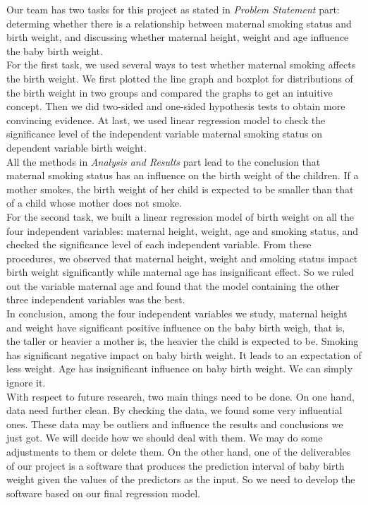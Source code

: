 \documentclass[oneside,12pt]{report}
\begin{document}
Our team has two tasks for this project as stated in \emph{Problem Statement} part: determing whether there is a relationship between maternal smoking status and birth weight, and discussing whether maternal height, weight and age influence the baby birth weight.\\
\indent For the first task, we used several ways to test whether maternal smoking affects the birth weight. We first plotted the line graph and boxplot for distributions of the birth weight in two groups and compared the graphs to get an intuitive concept. Then we did two-sided and one-sided hypothesis tests to obtain more convincing evidence. At last, we used linear regression model to check the significance level of the independent variable maternal smoking status on dependent variable birth weight.\\
\indent All the methods in \emph{Analysis and Results} part lead to the conclusion that maternal smoking status has an influence on the birth weight of the children. If a mother smokes, the birth weight of her child is expected to be smaller than that of a child whose mother does not smoke.\\
\indent For the second task, we built a linear regression model of birth weight on all the four independent variables: maternal height, weight, age and smoking status, and checked the significance level of each independent variable. From these procedures, we observed that maternal height, weight and smoking status impact birth weight significantly while maternal age has insignificant effect. So we ruled out the variable maternal age and found that the model containing the other three independent variables was the best.\\
\indent In conclusion, among the four independent variables we study, maternal height and weight have significant positive influence on the baby birth weigh, that is, the taller or heavier a mother is, the heavier the child is expected to be. Smoking has significant negative impact on baby birth weight. It leads to an expectation of less weight. Age has insignificant influence on baby birth weight. We can simply ignore it.\\
\indent With respect to future research, two main things need to be done. On one hand, data need further clean. By checking the data, we found some very influential ones. These data may be outliers and influence the results and conclusions we just got. We will decide how we should deal with them. We may do some adjustments to them or delete them. On the other hand, one of the deliverables of our project is a software that produces the prediction interval of baby birth weight given the values of the predictors as the input. So we need to develop the software based on our final regression model.
\end{document}
